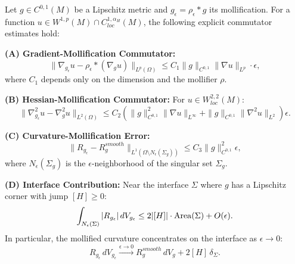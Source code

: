 \begin{proposition}\label{prop:CommutatorEstimates}
Let $g \in C^{0,1}(M)$ be a Lipschitz metric and $g_\epsilon = \rho_\epsilon * g$ its mollification. For a function $u \in W^{1,p}(M) \cap C^{1,\alpha_H}_{loc}(M)$, the following explicit commutator estimates hold:

\textbf{(A) Gradient-Mollification Commutator:}
\begin{equation}
    \|\nabla_{g_\epsilon} u - \rho_\epsilon * (\nabla_g u)\|_{L^p(\Omega)} \le C_1 \|g\|_{C^{0,1}} \|\nabla u\|_{L^p} \cdot \epsilon,
\end{equation}
where $C_1$ depends only on the dimension and the mollifier $\rho$.

\textbf{(B) Hessian-Mollification Commutator:}
For $u \in W^{2,2}_{loc}(M)$:
\begin{equation}
    \|\nabla^2_{g_\epsilon} u - \nabla^2_g u\|_{L^2(\Omega)} \le C_2 \left( \|g\|_{C^{0,1}}^2 \|\nabla u\|_{L^\infty} + \|g\|_{C^{0,1}} \|\nabla^2 u\|_{L^2} \right) \epsilon.
\end{equation}

\textbf{(C) Curvature-Mollification Error:}
\begin{equation}
    \|R_{g_\epsilon} - R_g^{smooth}\|_{L^1(\Omega \setminus N_\epsilon(\Sigma_g))} \le C_3 \|g\|_{C^{0,1}}^2 \epsilon,
\end{equation}
where $N_\epsilon(\Sigma_g)$ is the $\epsilon$-neighborhood of the singular set $\Sigma_g$.

\textbf{(D) Interface Contribution:}
Near the interface $\Sigma$ where $g$ has a Lipschitz corner with jump $[H] \ge 0$:
\begin{equation}
    \int_{N_\epsilon(\Sigma)} |R_{g_\epsilon}| \, dV_{g_\epsilon} \le 2|[H]| \cdot \operatorname{Area}(\Sigma) + O(\epsilon).
\end{equation}
In particular, the mollified curvature concentrates on the interface as $\epsilon \to 0$:
\begin{equation}
    R_{g_\epsilon} \, dV_{g_\epsilon} \xrightarrow{\epsilon \to 0} R_g^{smooth} \, dV_g + 2[H] \, \delta_\Sigma.
\end{equation}
\end{proposition}

